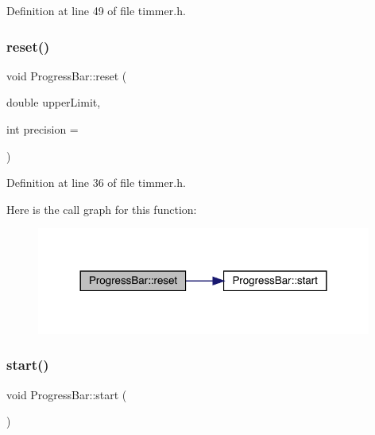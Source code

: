 Definition at line 49 of file timmer.\+h.

\mbox{\label{class_progress_bar_ac071fa5489c8a86ab174d150dfe1f195}} 
\subsubsection{\texorpdfstring{reset()}{reset()}}
{\footnotesize\ttfamily void Progress\+Bar\+::reset (\begin{DoxyParamCaption}\item[{double}]{upper\+Limit,  }\item[{int}]{precision = {} }\end{DoxyParamCaption})\hspace{0.3cm}{\ttfamily [inline]}}



Definition at line 36 of file timmer.\+h.

Here is the call graph for this function\+:\nopagebreak
\begin{figure}[H]
\begin{center}
\leavevmode
\includegraphics[width=312pt]{class_progress_bar_ac071fa5489c8a86ab174d150dfe1f195_cgraph}
\end{center}
\end{figure}
\mbox{\label{class_progress_bar_a25637ac030839b0ea50cfbb91b129359}} 
\subsubsection{\texorpdfstring{start()}{start()}}
{\footnotesize\ttfamily void Progress\+Bar\+::start (\begin{DoxyParamCaption}{ }\end{DoxyParamCaption})\hspace{0.3cm}{\ttfamily [inline]}}



